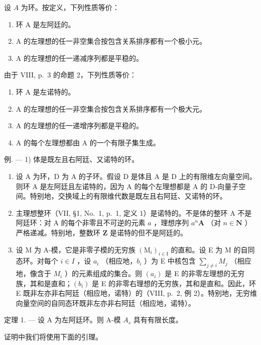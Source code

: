 设 \(A\) 为环。按定义，下列性质等价：

\begin{enumerate}
\def\labelenumi{(\roman{enumi})}
\item
  环 A 是左阿廷的。
\item
  A 的左理想的任一非空集合按包含关系排序都有一个极小元。
\item
  A 的左理想的任一递减序列都是平稳的。
\end{enumerate}

由于 VIII, p.~3 的命题 2，下列性质等价：

\begin{enumerate}
\def\labelenumi{(\roman{enumi})}
\item
  环 A 是左诺特的。
\item
  A 的左理想的任一非空集合按包含关系排序都有一个极大元。
\item
  A 的左理想的任一递增序列都是平稳的。
\item
  A 的每个左理想都由 A 的一个有限子集生成。
\end{enumerate}

例. --- 1) 体是既左且右阿廷、又诺特的环。

\begin{enumerate}
\def\labelenumi{\arabic{enumi})}
\setcounter{enumi}{1}
\item
  设 A 为环，D 为 A 的子环。假设 D 是体且 A 是 D 上的有限维左向量空间。则环 A 是左阿廷且左诺特的，因为 A 的每个左理想都是 A 的 D-向量子空间。特别地，交换域上的有限维代数是既左且右阿廷、又诺特的环。
\item
  主理想整环（VII, §1, No.~1, p.~1, 定义 1）是诺特的。不是体的整环 A 不是阿廷环：对 A 的每个非零且不可逆的元素 \(a\) ，理想序列 \(a^n\mathbf{A}\) （对 \(n \in \mathbf{N}\) ）严格递减。特别地，整数环 \(\mathbf{Z}\) 是诺特的但不是阿廷的。
\item
  设 M 为 A-模，它是非零子模的无穷族 \((\mathrm{M}_{i})_{i\in\mathrm{I}}\) 的直和。设 E 为 M 的自同态环。对每个 \(i\in I\) ，设 \(a_{i}\) （相应地，\(b_{i}\) ）为 E 中核包含 \(\sum_{j\neq i}M_{j}\) （相应地，像含于 \(M_{i}\) ）的元素组成的集合。则 \((a_{i})\) 是 E 的非零左理想的无穷族，其和是直和；\((b_{i})\) 是 E 的非零右理想的无穷族，其和是直和。因此，环 E 既非左亦非右阿廷（相应地，诺特）的（VIII, p.~2, 例 2）。特别地，无穷维向量空间的自同态环既非左亦非右阿廷（相应地，诺特）。
\end{enumerate}

定理 1. --- 设 A 为左阿廷环。则 A-模 \(A_{s}\) 具有有限长度。

证明中我们将使用下面的引理。

